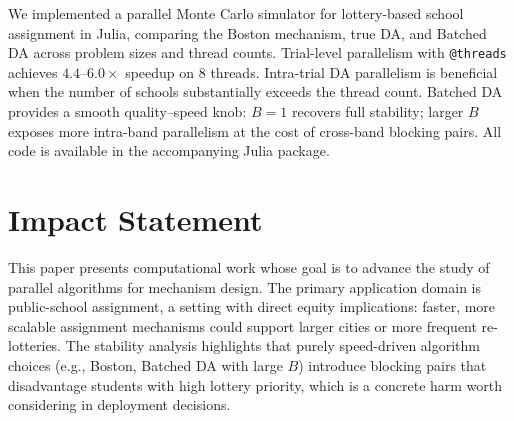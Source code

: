 \documentclass{article}
\theoremstyle{plain}
\theoremstyle{definition}
\theoremstyle{remark}
\begin{document}
We implemented a parallel Monte Carlo simulator for lottery-based school
assignment in Julia, comparing the Boston mechanism, true DA, and Batched DA
across problem sizes and thread counts. Trial-level parallelism with
\texttt{@threads} achieves $4.4$--$6.0\times$ speedup on 8 threads.
Intra-trial DA parallelism is beneficial when the number of schools
substantially exceeds the thread count. Batched DA provides a smooth
quality--speed knob: $B=1$ recovers full stability; larger $B$ exposes more
intra-band parallelism at the cost of cross-band blocking pairs. All code
is available in the accompanying Julia package.

\section*{Impact Statement}

This paper presents computational work whose goal is to advance the study of
parallel algorithms for mechanism design. The primary application domain is
public-school assignment, a setting with direct equity implications: faster,
more scalable assignment mechanisms could support larger cities or more
frequent re-lotteries. The stability analysis highlights that purely speed-driven
algorithm choices (e.g., Boston, Batched DA with large $B$) introduce blocking
pairs that disadvantage students with high lottery priority, which is a concrete
harm worth considering in deployment decisions.



\end{document}
